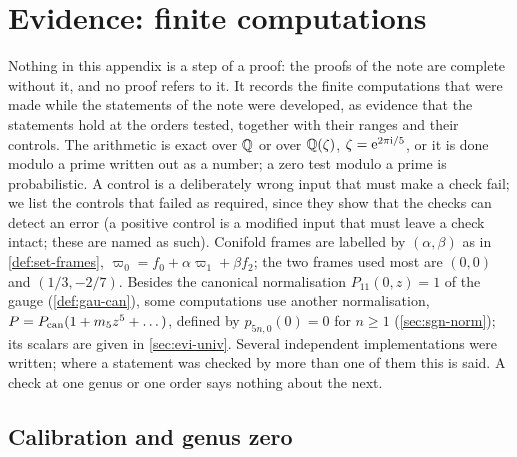 \section{Evidence: finite computations}
\label{sec:evi}

Nothing in this appendix is a step of a proof: the proofs of the note are complete without it, and no proof refers to it. It records the finite computations that were made while the statements of the note were developed, as evidence that the statements hold at the orders tested, together with their ranges and their controls. The arithmetic is exact over $\mathbb{Q}$ or over $\mathbb{Q}(\zeta)$, $\zeta=\mathrm{e}^{2\pi\mathrm{i}/5}$, or it is done modulo a prime written out as a number; a zero test modulo a prime is probabilistic. A control is a deliberately wrong input that must make a check fail; we list the controls that failed as required, since they show that the checks can detect an error (a positive control is a modified input that must leave a check intact; these are named as such). Conifold frames are labelled by $(\alpha,\beta)$ as in \cref{def:set-frames}, $\varpi_0=f_0+\alpha\varpi_1+\beta f_2$; the two frames used most are $(0,0)$ and $(1/3,-2/7)$. Besides the canonical normalisation $P_{11}(0,z)=1$ of the gauge (\cref{def:gau-can}), some computations use another normalisation, $P=P_{\mathrm{can}}(1+m_5z^5+\dots)$, defined by $p_{5n,0}(0)=0$ for $n\geq 1$ (\cref{sec:sgn-norm}); its scalars are given in \cref{sec:evi-univ}. Several independent implementations were written; where a statement was checked by more than one of them this is said. A check at one genus or one order says nothing about the next.

\subsection{Calibration and genus zero}
\label{sec:evi-calib}


